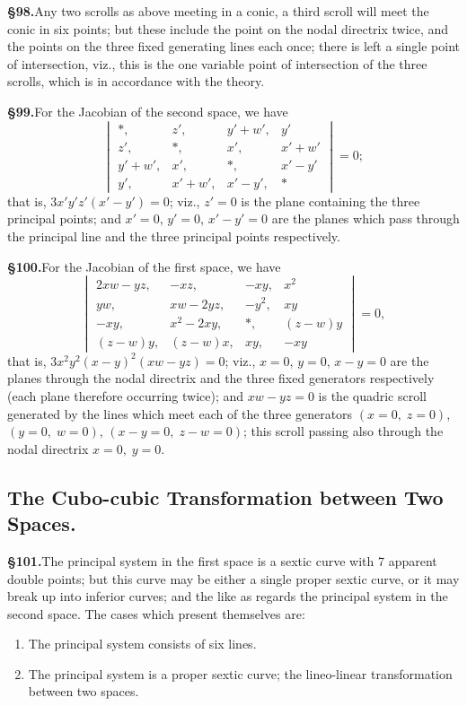 \documentclass[11pt,a4paper]{article}
\begin{document}
\textbf{\S 98.}\quad Any two scrolls as above meeting in a conic, a third scroll will meet the conic in six points; but these include the point on the nodal directrix twice, and the points on the three fixed generating lines each once; there is left a single point of intersection, viz., this is the one variable point of intersection of the three scrolls, which is in accordance with the theory.

\textbf{\S 99.}\quad For the Jacobian of the second space, we have
\[
\begin{vmatrix}
*, & z', & y' + w', & y' \\
z', & *, & x', & x' + w' \\
y' + w', & x', & *, & x' - y' \\
y', & x' + w', & x' - y', & *
\end{vmatrix} = 0;
\]
that is, $3x'y'z'(x' - y') = 0$; viz., $z' = 0$ is the plane containing the three principal points; and $x' = 0$, $y' = 0$, $x' - y' = 0$ are the planes which pass through the principal line and the three principal points respectively.

\textbf{\S 100.}\quad For the Jacobian of the first space, we have
\[
\begin{vmatrix}
2xw - yz, & -xz, & -xy, & x^2 \\
yw, & xw - 2yz, & -y^2, & xy \\
-xy, & x^2 - 2xy, & *, & (z - w)y \\
(z - w)y, & (z - w)x, & xy, & -xy
\end{vmatrix} = 0,
\]
that is, $3x^2y^2(x - y)^2(xw - yz) = 0$; viz., $x = 0$, $y = 0$, $x - y = 0$ are the planes through the nodal directrix and the three fixed generators respectively (each plane therefore occurring twice); and $xw - yz = 0$ is the quadric scroll generated by the lines which meet each of the three generators $(x = 0,\; z = 0)$, $(y = 0,\; w = 0)$, $(x - y = 0,\; z - w = 0)$; this scroll passing also through the nodal directrix $x = 0,\; y = 0$.

\subsection*{The Cubo-cubic Transformation between Two Spaces.}

\textbf{\S 101.}\quad The principal system in the first space is a sextic curve with 7 apparent double points; but this curve may be either a single proper sextic curve, or it may break up into inferior curves; and the like as regards the principal system in the second space. The cases which present themselves are:
\begin{enumerate}[label=(\Alph*)]
\item The principal system consists of six lines.
\item The principal system is a proper sextic curve; the lineo-linear transformation between two spaces.
\end{enumerate}
\end{document}
